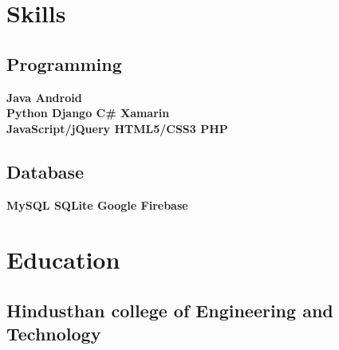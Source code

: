 \documentclass[a4paper]{arun-resume} %
\begin{document}
\begin{minipage}[t]{0.34\textwidth} %


\section{Skills}

\subsection{Programming}

\textbf{Java \textbullet{} Android} \\
\textbf{Python \textbullet{} Django \textbullet{} C\#  \textbullet{} Xamarin} \\
\textbf{JavaScript/jQuery \textbullet{} HTML5/CSS3 \textbullet{} PHP}


\vspace{\topsep}

\subsection{Database}
\textbf{MySQL \textbullet{} SQLite \textbullet{} Google Firebase}

\sectionspace %



\section{Education} 
\subsection{Hindusthan college of  Engineering and Technology}


\sectionspace %


\end{minipage}
\end{document}

